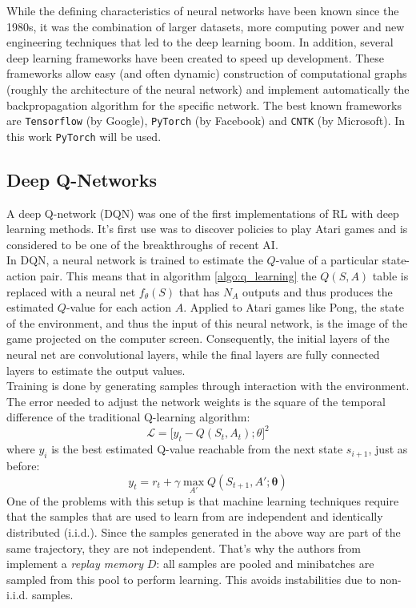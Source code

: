 While the defining characteristics of neural networks have been known since the 1980s, it was the combination of larger datasets, more computing power and new engineering techniques that led to the deep learning boom. In addition, several deep learning frameworks have been created to speed up development. These frameworks allow easy (and often dynamic) construction of computational graphs (roughly the architecture of the neural network) and implement automatically the backpropagation algorithm for the specific network. The best known frameworks are {\tt Tensorflow} (by Google), {\tt PyTorch} (by Facebook) and {\tt CNTK} (by Microsoft). In this work {\tt PyTorch} will be used.

\subsection{Deep Q-Networks}
\label{sec:deep_qn}
A deep Q-network (DQN) was one of the first implementations of RL with deep learning methods. It's first use was to discover policies to play Atari games \cite{mnih2013playing} and is considered to be one of the breakthroughs of recent AI.\\

In DQN, a neural network is trained to estimate the $Q$-value of a particular state-action pair. This means that in algorithm \ref{algo:q_learning} the $Q(S,A)$ table is replaced with a neural net $f_{\theta}(S)$ that has $N_A$ outputs and thus  produces the estimated $Q$-value for each action $A$. Applied to Atari games like Pong, the state of the environment, and thus the input of this neural network, is the image of the game projected on the computer screen. Consequently, the initial layers of the neural net are convolutional layers, while the final layers are fully connected layers to estimate the output values.\\

Training is done by generating samples through interaction with the environment. The error needed to adjust the network weights is the square of the temporal difference of the traditional Q-learning algorithm:
$$
\mathcal{L} = \big [y_t - Q(S_t, A_t); \theta \big ]^2
$$
where $y_i$ is the best estimated Q-value reachable from the next state $s_{i+1}$, just as before:
$$
y_t = r_t + \gamma \max_{A'} Q(S_{t+1}, A'; \bm{\theta})
$$
One of the problems with this setup is that machine learning techniques require that the samples that are used to learn from are independent and identically distributed (i.i.d.). Since the samples generated in the above way are part of the same trajectory, they are not independent. That's why the authors from \cite{mnih2015human} implement a \emph{replay memory} $D$: all samples are pooled and minibatches are sampled from this pool to perform learning. This avoids instabilities due to non-i.i.d. samples.\\

